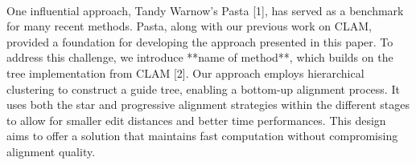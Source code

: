 \\One influential approach, Tandy Warnow's Pasta [1], has served as a benchmark for many recent methods. Pasta, along with our previous work on CLAM, provided a foundation for developing the approach presented in this paper. To address this challenge, we introduce **name of method**, which builds on the tree implementation from CLAM [2]. Our approach employs hierarchical clustering to construct a guide tree, enabling a bottom-up alignment process. It uses both the star and progressive alignment strategies within the different stages to allow for smaller edit distances and better time performances. This design aims to offer a solution that maintains fast computation without compromising alignment quality. 
\cite{mirarab2015astral}
